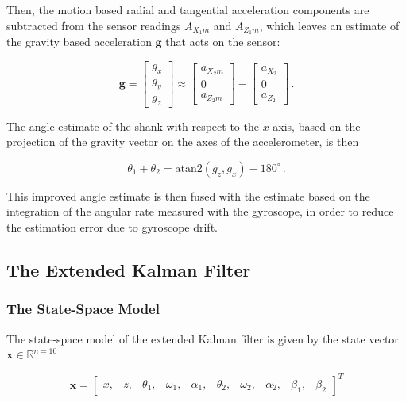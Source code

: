 Then, the motion based radial and tangential acceleration components are subtracted from the sensor readings $A_{X_1m}$ and $A_{Z_1m}$, which leaves an estimate of the gravity based acceleration $\mathbf{g}$ that acts on the sensor:

\begin{equation}
\mathbf{g} = \begin{bmatrix}
    g_x \\
    g_y \\
    g_z 
    \end{bmatrix} \approx 
    \begin{bmatrix}
    a_{X_2m} \\
    0 \\
    a_{Z_2m} 
    \end{bmatrix} -
    \begin{bmatrix}
    a_{X_2} \\
    0 \\
    a_{Z_2} 
    \end{bmatrix}\,.
\end{equation}

\noindent
The angle estimate of the shank with respect to the $x$-axis, based on the projection of the gravity vector on the axes of the accelerometer, is then

\begin{equation}
  \theta_1 + \theta_2 = \mbox{atan}2(g_z, g_x)-180^{\circ}\,.
\end{equation}

\noindent
This improved angle estimate is then fused with the estimate based on the integration of the angular rate measured with the gyroscope, in order to reduce the estimation error due to gyroscope drift.

\subsection{The Extended Kalman Filter} \label{sec:EKF_model}

\subsubsection{The State-Space Model}

The state-space model of the extended Kalman filter is given by the state vector $\mathbf{x} \in \mathbb{R}^{n=10}$

\begin{equation} \label{eq:state_vector}
  \mathbf{x} = \begin{bmatrix}
  	x, & z, & \theta_1, & \omega_1, & \alpha_1, & \theta_2, & \omega_2, & \alpha_2, & \beta_1, & \beta_2
  \end{bmatrix}^T
\end{equation}

